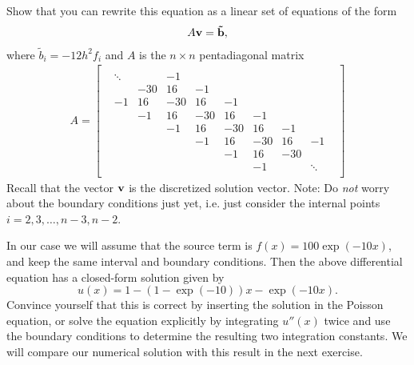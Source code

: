 \documentclass[11pt,a4wide]{article}
\begin{document}
\begin{itemize}
Show that you can rewrite this equation as a linear set of equations of the form
\begin{align}
A{\bf v} = {\bf \tilde{b}},
\end{align}
where $\tilde{b}_i = -12h^2 f_i$ and $A$ is the $n\times n$ pentadiagonal matrix 
  \begin{align}
A = \begin{bmatrix}  &        &        &         &       &      &       &       &       &       \\ 
                            & \ddots &        &    -1   &       &      &       &       &       &       \\ 
                            &        &  -30   &    16   &   -1  &      &       &       &       &       \\ 
                            &    -1  &   16   &   -30   &   16  &  -1  &       &       &       &       \\ 
                            &        &   -1   &    16   &  -30  &  16  &   -1  &       &       &       \\ 
                            &        &        &    -1   &   16  & -30  &   16  &   -1  &       &       \\ 
                            &        &        &         &   -1  &  16  &  -30  &   16  &  -1   &       \\ 
                            &        &        &         &       &  -1  &   16  &  -30  &       &       \\ 
                            &        &        &         &       &      &   -1  &       & \ddots&       \\ 
                            &        &        &         &       &      &       &       &       &       
\end{bmatrix}
  \end{align}
Recall that the vector ${\bf v}$ is the discretized solution vector. Note: Do \emph{not} worry about the boundary conditions just yet, i.e. just consider the internal points $i=2,3,\dots,n-3,n-2$.


In our case we will assume that the source term is $f(x) =100\exp{(−10x)}$, and keep the same interval and boundary conditions. Then the above differential equation has a closed-form solution given by
\[
u(x) = 1 -\left(1−\exp{(-10)}\right)x - \exp{(-10x)}.
\]
Convince yourself that this is correct by inserting the solution in the Poisson equation, or solve
the equation explicitly by integrating $u''(x)$ twice and use the
boundary conditions to determine the resulting two integration
constants. We will compare our numerical solution with this result in
the next exercise.
\end{itemize}
\end{document}
